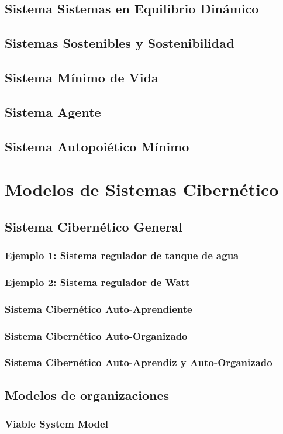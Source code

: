 \subsection{Sistema Sistemas en Equilibrio Dinámico}
\subsection{Sistemas Sostenibles y Sostenibilidad}
\subsection{Sistema Mínimo de Vida}
\subsection{Sistema Agente}
\subsection{Sistema Autopoiético Mínimo}
\section{Modelos de Sistemas Cibernético}

\subsection{Sistema Cibernético General}
\subsubsection{Ejemplo 1: Sistema regulador de tanque de agua}
\subsubsection{Ejemplo 2: Sistema regulador de Watt}
\subsubsection{Sistema Cibernético Auto-Aprendiente}
\subsubsection{Sistema Cibernético Auto-Organizado}
\subsubsection{Sistema Cibernético Auto-Aprendiz y Auto-Organizado}

\subsection{Modelos de organizaciones}
\subsubsection{Viable System Model}
